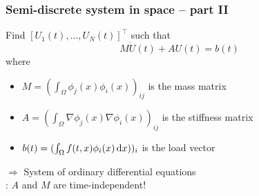 \begin{frame}
  \frametitle{Semi-discrete system in space -- part II}
  Find $[U_1(t),\ldots, U_N(t)]^{\top}$ such that
  \begin{equation*}
    M \dot U(t) + AU(t) = b(t)
  \end{equation*}
  where
  \begin{itemize}
    \item $M = (\int_{\Omega} \phi_j(x) \phi_i(x))_{ij}$ is the mass matrix
    \item $A = (\int_{\Omega} \nabla \phi_j(x) \nabla \phi_i(x))_{ij}$ is the stiffness matrix
    \item $b(t) = (\int_{\Omega}f(t,x) \phi_i(x) \, \mathrm{d}x))_i$ is the load vector
  \end{itemize}
  \bigskip
  $\Rightarrow$ System of ordinary differential equations
  \\
  \bigskip
  \noindent{}: $A$ and $M$ are time-\alert{independent}!
\end{frame}
